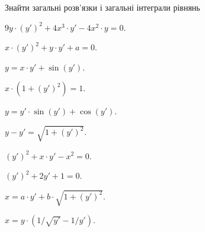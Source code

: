Знайти загальні розв'язки і загальні інтеграли рівнянь

\begin{problem}
	$9 y \cdot (y')^2 + 4 x^3 \cdot y' - 4 x^2 \cdot y = 0$.
\end{problem}

\begin{problem}
	$x \cdot (y')^2 + y \cdot y' + a = 0$.
\end{problem}

\begin{problem}
	$y = x \cdot y' + \sin (y')$.
\end{problem}

\begin{problem}
	$x \cdot (1 + (y')^2) = 1$.
\end{problem}

\begin{problem}
	$y = y' \cdot \sin (y') + \cos (y')$.
\end{problem}

\begin{problem}
	$y - y' = \sqrt{1 + (y')^2}$.
\end{problem}

\begin{problem}
	$(y')^2 + x \cdot y' - x^2 = 0$.
\end{problem}

\begin{problem}
	$(y')^2 + 2 y' + 1 = 0$.
\end{problem}

\begin{problem}
	$x = a \cdot y' + b \cdot \sqrt{1 + (y')^2}$.
\end{problem}

\begin{problem}
	$x = y \cdot \left(1 / \sqrt{y'} - 1 / y' \right)$.
\end{problem}
